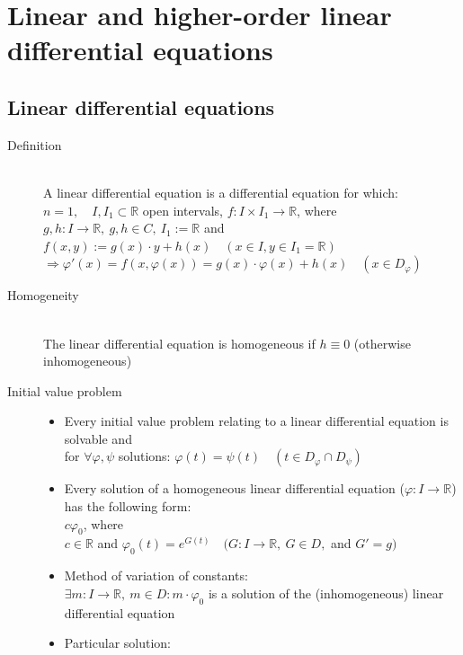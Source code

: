 \documentclass[margin=0px]{article}
\newcommand{\R}{\mathbb{R}}
\begin{document}
\section{Linear and higher-order linear differential equations}
\subsection{Linear differential equations}
\begin{description}
    \item[Definition] \hfill \\
        A linear differential equation is a differential equation for which:\\
        $ n=1, \quad I,I_1 \subset \R $ open intervals, $f:I\times I_1 \rightarrow \R$, where \\
        $g,h : I \rightarrow \R, \ g,h \in C, \ I_1 := \R$ and \\
        $f(x,y) := g(x)\cdot y + h(x) \quad (x \in I, y \in I_1 = \R) $\\
        $ \Rightarrow \varphi'(x) = f(x, \varphi(x)) = g(x) \cdot \varphi(x) + h(x) \quad (x \in D_{\varphi})$
    \item[Homogeneity] \hfill \\
        The linear differential equation is homogeneous if $ h \equiv 0$ (otherwise inhomogeneous)
    \item[Initial value problem] \hfill
        \begin{itemize}
            \item Every initial value problem relating to a linear differential equation is solvable and \\
                  for $\forall \varphi, \psi $ solutions: $ \varphi(t) = \psi(t) \quad (t \in D_{\varphi} \cap D_{\psi} )$
            \item Every solution of a homogeneous linear differential equation ($\varphi : I \rightarrow \R$) has the following form: \\
                  $ c\varphi_0$, where \\
                  $c \in \R$ and $\varphi_0(t) = e^{G(t)} \quad (G:I\rightarrow\R, \ G \in D, $ and $ G' = g)$
            \item Method of variation of constants:\\
                  $ \exists m:I\rightarrow\R, \ m \in D : m\cdot\varphi_0$ is a solution of the (inhomogeneous) linear differential equation
            \item Particular solution: \\

\end{itemize}
\end{description}
\end{document}

